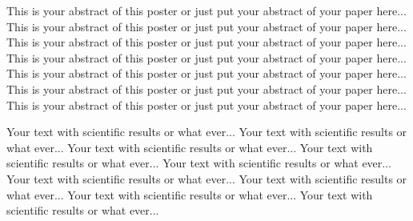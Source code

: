 \documentclass[landscape,a0b,final]{a0poster}
\newenvironment{poster}{
  \begin{center}
  \begin{minipage}[c]{0.98\textwidth}
}{
  \end{minipage} 
  \end{center}
}
\newenvironment{pcolumn}[1]{
  \begin{minipage}{#1\textwidth}
  \begin{center}
}{
  \end{center}
  \end{minipage}
}
\newcommand{\pbox}[4]{
\psshadowbox[#3]{
\begin{minipage}[t][#2][t]{#1}
#4
\end{minipage}
}}
\begin{document}
\begin{poster}
\begin{center}
\begin{pcolumn}{0.32}
{%




}
\end{pcolumn}
\end{center}



\vspace*{2cm}

\begin{multicols}{3}


\begin{center}\pbox{0.8\columnwidth}{}{linewidth=2mm,framearc=0.1,linecolor=lightblue,fillstyle=gradient,gradangle=0,gradbegin=white,gradend=whiteblue,gradmidpoint=1.0,framesep=1em}{\begin{center}Abstract\end{center}}\end{center}
\vspace{1.25cm}

This is your abstract of this poster or just put your abstract of your
paper here... This is your abstract of this poster or just put your
abstract of your paper here... This is your abstract of this poster or
just put your abstract of your paper here... This is your abstract of
this poster or just put your abstract of your paper here... This is
your abstract of this poster or just put your abstract of your paper
here... This is your abstract of this poster or just put your abstract
of your paper here... This is your abstract of this poster or just put
your abstract of your paper here...


\vspace{2cm}\begin{center}\pbox{0.8\columnwidth}{}{linewidth=2mm,framearc=0.1,linecolor=lightblue,fillstyle=gradient,gradangle=0,gradbegin=white,gradend=whiteblue,gradmidpoint=1.0,framesep=1em}{\begin{center}Introduction\end{center}}\end{center}\vspace{1.25cm}

Your text with scientific results or what ever... Your text with
scientific results or what ever... Your text with scientific results or
what ever... Your text with scientific results or what ever... Your
text with scientific results or what ever... Your text with scientific
results or what ever... Your text with scientific results or what
ever... Your text with scientific results or what ever... Your text
with scientific results or what ever...


\end{multicols}
\end{poster}
\end{document}
